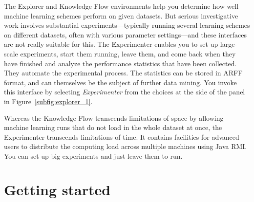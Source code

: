 The Explorer and Knowledge Flow environments help you determine how
well machine learning schemes perform on given datasets. But serious
investigative work involves substantial experiments---typically
running several learning schemes on different datasets, often with
various parameter settings---and these interfaces are not really
suitable for this. The Experimenter enables you to set up large-scale
experiments, start them running, leave them, and come back when they
have finished and analyze the performance statistics that have been
collected. They automate the experimental process. The statistics can
be stored in ARFF format, and can themselves be the subject of further
data mining. You invoke this interface by selecting
\textit{Experimenter} from the choices at the side of the panel in
Figure~\ref{subfig:explorer_1}.

Whereas the Knowledge Flow transcends limitations of space by allowing
machine learning runs that do not load in the whole dataset at once,
the Experimenter transcends limitations of time. It contains
facilities for advanced users to distribute the computing load across
multiple machines using Java RMI. You can set up big experiments and
just leave them to run.

\section{Getting started}

